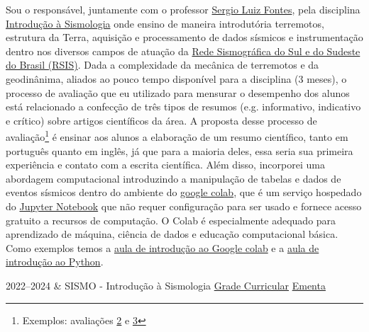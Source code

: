 \documentclass[10pt,a4paper,oneside]{book}
\begin{document}
Sou o responsável, juntamente com o professor \href{http://lattes.cnpq.br/8537150955145617}{Sergio Luiz Fontes}, pela disciplina \href{https://www.gov.br/observatorio/pt-br/assuntos/programas-academicos/pos-graduacao-em-geofisica/ementas/introducao-a-sismologia}{Introdução à Sismologia} onde ensino de maneira introdutória terremotos, estrutura da Terra, aquisição e processamento de dados sísmicos e instrumentação dentro nos diversos campos de atuação da \href{http://www.rsis.on.br/}{Rede Sismográfica do Sul e do Sudeste do Brasil (RSIS)}. Dada a complexidade da mecânica de terremotos e da geodinânima, aliados ao pouco tempo disponível para a disciplina (3 meses), o processo de avaliação que eu utilizado para mensurar o desempenho dos alunos está relacionado a confecção de três tipos de resumos (e.g. informativo, indicativo e crítico) sobre artigos científicos da área. A proposta desse processo de avaliação\footnote{Exemplos: avaliações \href{https://docs.google.com/forms/d/e/1FAIpQLSffa78ttrM_i5cWZmISGNz-lhwShi3Wzk7AUbWPgN6lhDuTNQ/viewform}{2} e \href{https://docs.google.com/forms/d/e/1FAIpQLSe8FIH4vSjn5QLT79BdG8eVRLti0le8i6yssInmQTX1iXNrYA/viewform}{3}} é ensinar aos alunos a elaboração de um resumo científico, tanto em português quanto em inglês, já que para a maioria deles, essa seria sua primeira experiência e contato com a escrita científica. Além disso, incorporei uma abordagem computacional introduzindo a manipulação de tabelas e dados de eventos sísmicos dentro do ambiente do \href{https://colab.google/}{google colab}, que é um serviço hospedado do \href{https://jupyter.org/}{Jupyter Notebook} que não requer configuração para ser usado e fornece acesso gratuito a recursos de computação. O Colab é especialmente adequado para aprendizado de máquina, ciência de dados e educação computacional básica. Como exemplos temos a \href{https://colab.research.google.com/drive/1c7Vc_s0A5GURJIab2vTS-LCW8fPlRaXt?usp=sharing}{aula de introdução ao Google colab} e a \href{https://colab.research.google.com/drive/17VaW0MkQxcxUjGaeowaVwyRORrijCXaV?usp=sharing}{aula de introdução ao Python}.

\bigskip

\begin{subsummarybox}[frametitle=\faGraduationCap{}\quad Disciplinas ministradas no Observatório Nacional]
  \begin{courselist}
    2022--2024 &
      SISMO - Introdução à Sismologia
      \newline
      \faInfoCircle \href{https://www.gov.br/observatorio/pt-br/assuntos/programas-academicos/pos-graduacao-em-geofisica/grade-curricular}{Grade Curricular}
      \newline
      \faInbox \href{https://www.gov.br/observatorio/pt-br/assuntos/programas-academicos/pos-graduacao-em-geofisica/ementas/introducao-a-sismologia}{Ementa}
  \end{courselist}
\end{subsummarybox}
\end{document}
